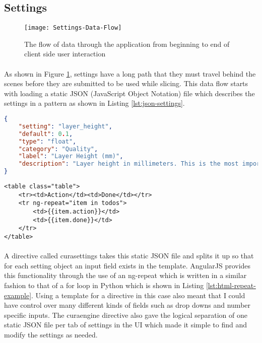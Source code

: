 \subsection{Settings}%
\begin{figure}[!ht]
  \centering
  \texttt{[image: Settings-Data-Flow]}
  \caption{The flow of data through the application from beginning to end of client side user interaction}
  \label{fig:settings-data-flow}
\end{figure}
\paragraph{}
As shown in Figure \ref{fig:settings-data-flow}, settings have a long path that they must travel behind the scenes before they are submitted to be used while slicing. 
This data flow starts with loading a static JSON (JavaScript Object Notation) file which describes the settings in a pattern as shown in Listing \ref{lst:json-settings}.
\begin{lstlisting}[language=json, style=thesiscode , label={lst:json-settings}, caption=A sample from a static settings file in JSON format.]
{
    "setting": "layer_height",
    "default": 0.1,
    "type": "float",
    "category": "Quality",
    "label": "Layer Height (mm)",
    "description": "Layer height in millimeters. This is the most important setting to determine the quality of your print. Normal quality prints are 0.1mm, high quality is 0.06mm. You can go up to 0.25mm."
}
\end{lstlisting}
\begin{lstlisting}[language=HTML5, style=thesiscode, label={lst:html-repeat-example}, caption=An example of a ng-repeat looping construct in HTML5.]
<table class="table">
	<tr><td>Action</td><td>Done</td></tr>
	<tr ng-repeat="item in todos">
		<td>{{item.action}}</td>
		<td>{{item.done}}</td>
	</tr>
</table>
\end{lstlisting}

\paragraph{}
A directive called curasettings takes this static JSON file and splits it up so that for each setting object an input field exists in the template.
AngularJS provides this functionality through the use of an ng-repeat which is written in a similar fashion to that of a for loop in Python which is shown in Listing \ref{lst:html-repeat-example}.
Using a template for a directive in this case also meant that I could have control over many different kinds of fields such as drop downs and number specific inputs.
The curaengine directive also gave the logical separation of one static JSON file per tab of settings in the UI which made it simple to find and modify the settings as needed.

